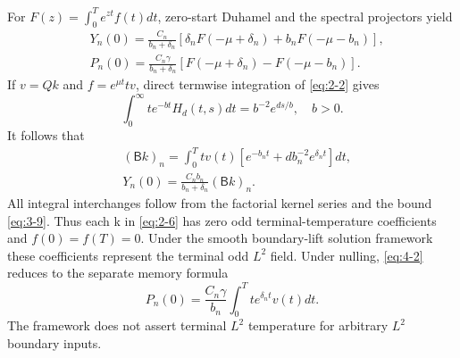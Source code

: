 For \(F(z)=\int_0^T e^{zt}f(t)dt\), zero-start Duhamel and the spectral projectors yield
\begin{equation}\label{eq:4-2}
\begin{aligned}
&Y_n(0)=\frac{C_n}{b_n+\delta_n}[\delta_nF(-\mu+\delta_n)+b_nF(-\mu-b_n)],\\
&
P_n(0)=\frac{C_n\gamma}{b_n+\delta_n}[F(-\mu+\delta_n)-F(-\mu-b_n)].
\end{aligned}
\end{equation}
If \(v=Qk\) and \(f=e^{\mu t}t v\), direct termwise integration of \eqref{eq:2-2} gives
\begin{equation}\label{eq:4-3}
\int_0^\infty t e^{-bt}H_d(t,s)dt=b^{-2}e^{ds/b},\quad b>0.
\end{equation}
It follows that
\begin{equation}\label{eq:4-4}
\begin{aligned}
&(\mathsf Bk)_n=\int_0^T t v(t)\left[e^{-b_nt}+d b_n^{-2}e^{\delta_nt}\right]dt,\\
&
Y_n(0)=\frac{C_n b_n}{b_n+\delta_n}(\mathsf Bk)_n.
\end{aligned}
\end{equation}
All integral interchanges follow from the factorial kernel series and the bound \eqref{eq:3-9}. Thus each k in \eqref{eq:2-6} has zero odd terminal-temperature coefficients and \(f(0)=f(T)=0\). Under the smooth boundary-lift solution framework these coefficients represent the terminal odd \(L^2\) field. Under nulling, \eqref{eq:4-2} reduces to the separate memory formula
\begin{equation}\label{eq:4-5}
P_n(0)=\frac{C_n\gamma}{b_n}\int_0^T t e^{\delta_nt}v(t)dt.
\end{equation}
The framework does not assert terminal \(L^2\) temperature for arbitrary \(L^2\) boundary inputs.
